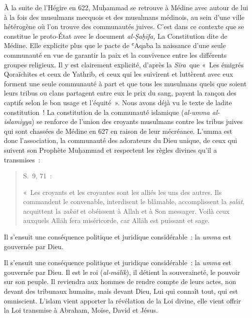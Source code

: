 À la suite de l'Hégire en 622, Muḥammad se retrouve à Médine avec autour
de lui à la fois des musulmans mecquois et des musulmans médinois, au
sein d'une ville hétérogène où l'on trouve des communautés juives. C'est
dans ce contexte que se constitue le proto-État avec le document
\emph{al-Ṣaḥīfa,} La Constitution dite de Médine. Elle explicite plus
que le pacte de ʿAqaba la naissance d'une seule communauté en vue de
garantir la paix et la convivence entre les différents groupes
religieux. Il y est clairement explicité, d'après la \emph{Sīra}~que
«~Les émigrés Qoraïchites et ceux de Yathrib, et ceux qui les suivirent
et luttèrent avec eux forment une seule communauté à part et que tous
les musulmans quels que soient leurs tribus ou clans partagent entre eux
le prix du sang, payent la rançon des captifs selon le bon usage et
l'équité~». Nous avons déjà vu le texte de ladite constitution~! La
constitution de la communauté islamique (\emph{al-umma al-islamiyya}) se
renforce de l'union des croyants musulmans contre les tribus juives qui
sont chassées de Médine en 627 en raison de leur mécréance. L'umma est
donc l'association, la communauté des adorateurs du Dieu unique, de ceux
qui suivent son Prophète Muḥammad et respectent les règles divines qu'il
a transmises~:
\begin{quote}
    

S.~9, 71~:


«~Les croyants et les croyantes sont les alliés les uns des autres. Ils
commandent le convenable, interdisent le blâmable, accomplissent la
\emph{ṣalāt}, acquittent la \emph{zakāt} et obéissent à Allah et à Son
messager. Voilà ceux auxquels Allāh fera miséricorde, car Allāh est
puissant et sage.
\end{quote}

\begin{Synthesis}
Il s'ensuit une conséquence politique et juridique considérable~: la
\emph{umma} est gouvernée par Dieu.
\end{Synthesis}


Il s'ensuit une conséquence politique et juridique considérable~: la
\emph{umma} est gouvernée par Dieu. Il est le roi (\emph{al-mālik}), il
détient la souveraineté, le pouvoir sur son peuple. Il reviendra aux
hommes de rendre compte de leurs actes, non devant des tribunaux
humains, mais devant Dieu, Lui qui connaît tout, qui est omniscient.
L'islam vient apporter la révélation de la Loi divine, elle vient offrir
la Loi transmise à Abraham, Moïse, David et Jésus.

